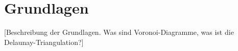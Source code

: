 \section{Grundlagen}

[Beschreibung der Grundlagen. Was sind Voronoi-Diagramme, was ist die Delaunay-Triangulation?]
